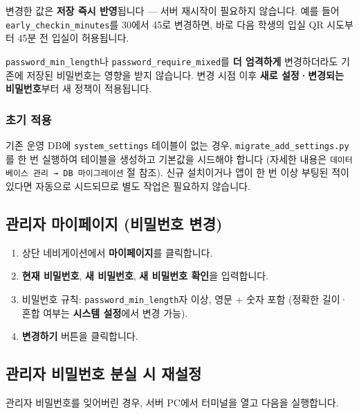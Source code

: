 \documentclass[a4paper,12pt]{article}
\newcommand{\menu}[1]{\textcolor{primary}{\textbf{#1}}}
\begin{document}
\begin{notebox}
  변경한 값은 \textbf{저장 즉시 반영}됩니다 --- 서버 재시작이 필요하지 않습니다.
  예를 들어 \texttt{early\_checkin\_minutes}를 30에서 45로 변경하면,
  바로 다음 학생의 입실 QR 시도부터 45분 전 입실이 허용됩니다.
\end{notebox}

\begin{warnbox}
  \texttt{password\_min\_length}나 \texttt{password\_require\_mixed}를 \textbf{더 엄격하게} 변경하더라도
  기존에 저장된 비밀번호는 영향을 받지 않습니다.
  변경 시점 이후 \textbf{새로 설정·변경되는 비밀번호}부터 새 정책이 적용됩니다.
\end{warnbox}

\subsubsection*{초기 적용}

기존 운영 DB에 \texttt{system\_settings} 테이블이 없는 경우,
\texttt{migrate\_add\_settings.py}를 한 번 실행하여 테이블을 생성하고 기본값을 시드해야 합니다
(자세한 내용은 \texttt{데이터베이스 관리 → DB 마이그레이션} 절 참조).
신규 설치이거나 앱이 한 번 이상 부팅된 적이 있다면 자동으로 시드되므로 별도 작업은 필요하지 않습니다.

\subsection{관리자 마이페이지 (비밀번호 변경)}

\begin{enumerate}[leftmargin=1.5em]
    \item 상단 네비게이션에서 \menu{마이페이지}를 클릭합니다.
    \item \textbf{현재 비밀번호}, \textbf{새 비밀번호}, \textbf{새 비밀번호 확인}을 입력합니다.
    \item 비밀번호 규칙: \texttt{password\_min\_length}자 이상, 영문 + 숫자 포함
          (정확한 길이·혼합 여부는 \menu{시스템 설정}에서 변경 가능).
    \item \menu{변경하기} 버튼을 클릭합니다.
\end{enumerate}

\subsection{관리자 비밀번호 분실 시 재설정}

관리자 비밀번호를 잊어버린 경우, 서버 PC에서 터미널을 열고 다음을 실행합니다.
\end{document}
